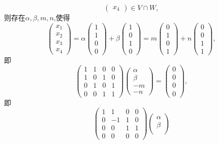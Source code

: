 ﻿\documentclass{book} \usepackage{exsheets} \usepackage{xeCJK}
\begin{document}
\begin{solution}
$$\begin{pmatrix}
  x_4
\end{pmatrix}\in V\cap W,
$$
则存在$\alpha,\beta,m,n$,使得
$$
\begin{pmatrix}
  x_1\\
  x_2\\
  x_3\\
  x_4
\end{pmatrix}=\alpha
\begin{pmatrix}
  1\\
  1\\
  0\\
  0
\end{pmatrix}+\beta
\begin{pmatrix}
  1\\
  0\\
  1\\
  0
\end{pmatrix}=m
\begin{pmatrix}
  0\\
  1\\
  0\\
  1
\end{pmatrix}+n
\begin{pmatrix}
  0\\
  0\\
  1\\
  1
\end{pmatrix},
$$
即
$$
\begin{pmatrix}
  1&1&0&0\\
  1&0&1&0\\
  0&1&0&1\\
  0&0&1&1
\end{pmatrix}
\begin{pmatrix}
  \alpha\\
  \beta\\
  -m\\
  -n
\end{pmatrix}=
\begin{pmatrix}
  0\\
  0\\
  0\\
  0
\end{pmatrix},
$$
即
$$
\begin{pmatrix}
  1&1&0&0\\
  0&-1&1&0\\
  0&0&1&1\\
  0&0&0&0
\end{pmatrix}
\begin{pmatrix}
  \alpha\\
  \beta\\

\end{pmatrix}$$
\end{solution}
\end{document}
